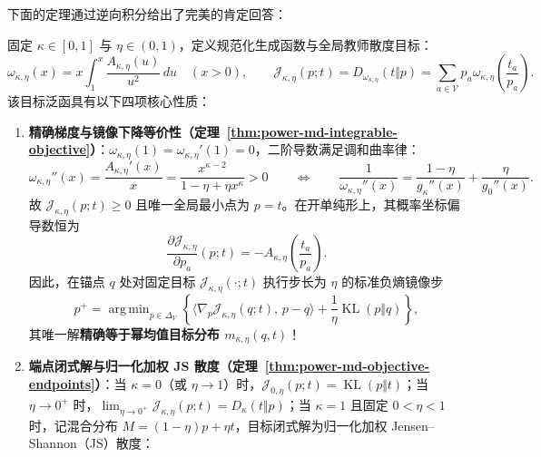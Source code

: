 \documentclass[lang=cn,scheme=chinese,openany]{../book/elegantbook}
\newcommand{\KL}{\operatorname{KL}}
\DeclareMathOperator*{\argmin}{arg\,min}
\begin{document}
下面的定理通过逆向积分给出了完美的肯定回答：

\begin{theorem}
\label{thm:power-md-integrable-objective}
\label{thm:power-md-objective-endpoints}
\label{thm:power-md-uniform-cap}
\label{thm:power-md-relative-smoothness}
固定 $\kappa\in[0,1]$ 与 $\eta\in(0,1)$，定义规范化生成函数与全局教师散度目标：
\begin{equation}
 \omega_{\kappa,\eta}(x)
 =x\int_1^x\frac{A_{\kappa,\eta}(u)}{u^2}\,du
 \quad (x>0),
 \qquad
 \mathcal J_{\kappa,\eta}(p;t)
 =D_{\omega_{\kappa,\eta}}(t\Vert p)
 =\sum_{a\in\mathcal V} p_a\omega_{\kappa,\eta}\!\left(\frac{t_a}{p_a}\right).
 \label{eq:power-md-generator-integral}
\end{equation}
该目标泛函具有以下四项核心性质：
\begin{enumerate}
\item \textbf{精确梯度与镜像下降等价性（定理~\ref{thm:power-md-integrable-objective}）}：$\omega_{\kappa,\eta}(1)=\omega_{\kappa,\eta}'(1)=0$，二阶导数满足调和曲率律：
\begin{equation}
 \omega_{\kappa,\eta}''(x)=\frac{A_{\kappa,\eta}'(x)}{x}
 =\frac{x^{\kappa-2}}{1-\eta+\eta x^\kappa}>0
 \qquad\Longleftrightarrow\qquad
 \frac1{\omega_{\kappa,\eta}''(x)}
 =\frac{1-\eta}{g_\kappa''(x)}+\frac\eta{g_0''(x)}.
 \label{eq:power-md-curvature}
\end{equation}
故 $\mathcal J_{\kappa,\eta}(p;t)\ge 0$ 且唯一全局最小点为 $p=t$。在开单纯形上，其概率坐标偏导数恒为
\begin{equation}
 \frac{\partial\mathcal J_{\kappa,\eta}}{\partial p_a}(p;t)
 =-A_{\kappa,\eta}\!\left(\frac{t_a}{p_a}\right).
 \label{eq:power-md-exact-gradient}
\end{equation}
因此，在锚点 $q$ 处对固定目标 $\mathcal J_{\kappa,\eta}(\cdot;t)$ 执行步长为 $\eta$ 的标准负熵镜像步
\begin{equation}
 p^+=\argmin_{p\in\Delta_V}
 \left\{\bigl\langle\nabla_p\mathcal J_{\kappa,\eta}(q;t),\,p-q\bigr\rangle
       +\frac1\eta\KL(p\Vert q)\right\},
 \label{eq:power-md-exact-step}
\end{equation}
其唯一解\textbf{精确等于幂均值目标分布 $m_{\kappa,\eta}(q,t)$}！
\item \textbf{端点闭式解与归一化加权 JS 散度（定理~\ref{thm:power-md-objective-endpoints}）}：当 $\kappa=0$（或 $\eta\to 1$）时，$\mathcal J_{0,\eta}(p;t)=\KL(p\Vert t)$；当 $\eta\to 0^+$ 时，$\lim_{\eta\to 0^+}\mathcal J_{\kappa,\eta}(p;t)=D_\kappa(t\Vert p)$；当 $\kappa=1$ 且固定 $0<\eta<1$ 时，记混合分布 $M=(1-\eta)p+\eta t$，目标闭式解为归一化加权 Jensen--Shannon（JS）散度：

\end{enumerate}
\end{theorem}
\end{document}
